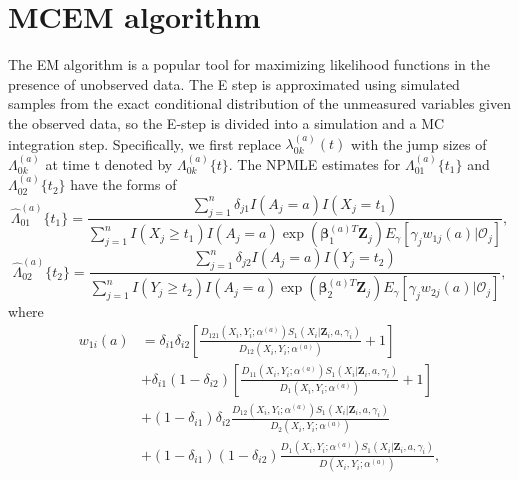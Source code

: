 \documentclass[12pt]{article}
\def\bfZ{\mathbf{Z}}
\def\bfbeta{\bm{\beta}}
\begin{document}
\section{MCEM algorithm}
\label{sec:mcem algorithm}
The EM algorithm is a popular tool for maximizing likelihood functions in the presence of unobserved data. The E step is approximated using simulated samples from the exact conditional distribution of the unmeasured variables given the observed data, so the E-step is divided into a simulation and a MC integration step. Specifically, we first replace $\lambda_{0k}^{(a)}(t)$ %
with the jump sizes of $\Lambda_{0k}^{(a)}$ at time t denoted by $\Lambda_{0k}^{(a)}\{t\}$. The NPMLE estimates for $\Lambda_{01}^{(a)}\{t_1\}$ and $\Lambda_{02}^{(a)}\{t_2\}$ have the forms of
\begin{equation}
\widehat{\Lambda}_{01}^{(a)}\{t_1\} = \frac{\sum\limits_{j=1}^n \delta_{j1}I(A_j=a)I(X_j=t_1)}{\sum\limits_{j=1}^n I(X_j\geq t_1)I(A_j=a)\exp(\bfbeta_1^{(a)T}\bfZ_j)E_{\gamma}[\gamma_jw_{1j}(a)|\mathcal{O}_j]},
\end{equation}
\begin{equation}
\widehat{\Lambda}_{02}^{(a)}\{t_2\} = \frac{\sum\limits_{j=1}^n \delta_{j2}I(A_j=a)I(Y_j=t_2)}{\sum\limits_{j=1}^n I(Y_j\geq t_2)I(A_j=a)\exp(\bfbeta_2^{(a)T}\bfZ_j)E_{\gamma}[\gamma_jw_{2j}(a)|\mathcal{O}_j]},
\end{equation}
where 
\begin{equation*}
\begin{split}
w_{1i}(a) &= \delta_{i1}\delta_{i2}\left[ \frac{D_{121}(X_i,Y_i;\alpha^{(a)})S_1(X_i|\bfZ_i,a,\gamma_i)}{D_{12}(X_i,Y_i;\alpha^{(a)})}+1\right]\\
&+\delta_{i1}(1-\delta_{i2})\left[\frac{D_{11}(X_i,Y_i;\alpha^{(a)})S_1(X_i|\bfZ_i,a,\gamma_i)}{D_{1}(X_i,Y_i;\alpha^{(a)})}+1 \right]\\
&+(1-\delta_{i1})\delta_{i2}\frac{D_{12}(X_i,Y_i;\alpha^{(a)})S_1(X_i|\bfZ_i,a,\gamma_i)}{D_{2}(X_i,Y_i;\alpha^{(a)})}\\
&+(1-\delta_{i1})(1-\delta_{i2})\frac{D_{1}(X_i,Y_i;\alpha^{(a)})S_1(X_i|\bfZ_i,a,\gamma_i)}{D(X_i,Y_i;\alpha^{(a)})},
\end{split}
\end{equation*}
\end{document}
